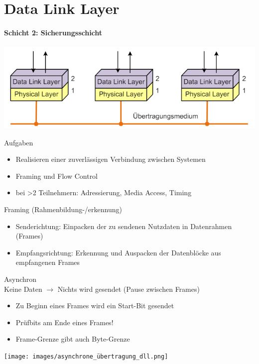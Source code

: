 \section{Data Link Layer}
\paragraph{Schicht 2: Sicherungsschicht}
\vspace{-1mm}
\includegraphics[width=0.5\linewidth]{images/data_link_layer.png}
\begin{definition}{Aufgaben}
    \begin{itemize}
        \item Realisieren einer zuverlässigen Verbindung zwischen Systemen
        \item Framing und Flow Control
        \item bei >2 Teilnehmern: Adressierung, Media Access, Timing
    \end{itemize}
\end{definition}

\begin{definition}{Framing (Rahmenbildung-/erkennung)}
    \begin{itemize}
        \item Senderichtung: Einpacken der zu sendenen Nutzdaten in Datenrahmen (Frames)
        \item Empfangsrichtung: Erkennung und Auspacken der Datenblöcke aus empfangenen Frames
    \end{itemize}
\end{definition}

\begin{concept}{Asynchron}\\
    Keine Daten $\rightarrow$ Nichts wird gesendet (Pause zwischen Frames)
    \begin{itemize}
        \item Zu Beginn eines Frames wird ein Start-Bit gesendet
        \item Prüfbits am Ende eines Frames!
        \item Frame-Grenze gibt auch Byte-Grenze
    \end{itemize}
    \texttt{[image: images/asynchrone\_übertragung\_dll.png]}
\end{concept}

